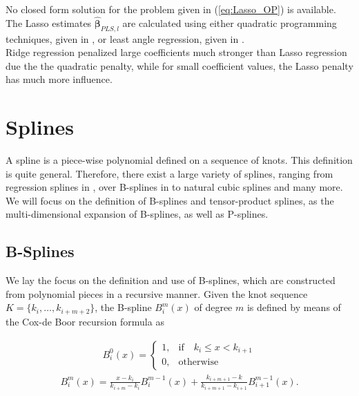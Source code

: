 \documentclass[10pt,a4paper]{article}
\begin{document}
No closed form solution for the problem given in (\ref{eq:Lasso_OP}) is available. The Lasso estimates $\boldsymbol{\hat{\beta}}_{PLS,l}$ are calculated using either quadratic programming techniques, given in \cite{tibshirani1996lasso}, or least angle regression, given in \cite{efron2004leastangleregression}. \\

Ridge regression penalized large coefficients much stronger than Lasso regression due the the quadratic penalty, while for small coefficient values, the Lasso penalty has much more influence. \cite{tibshirani1996lasso}

\section{Splines} \label{sec:Splines}
	
A spline is a piece-wise polynomial defined on a sequence of knots. This definition is quite general. Therefore, there exist a large variety of splines, ranging from regression splines in \cite{eubank1990regressionsplines}, over B-splines in \cite{deBoor1978practicalGuideToSplines} to natural cubic splines and many more. We will focus on the definition of B-splines and tensor-product splines, as the multi-dimensional expansion of B-splines, as well as P-splines. \cite{deBoor1978practicalGuideToSplines} \cite{eilers1996flexible}
\subsection{B-Splines}

We lay the focus on the definition and use of B-splines, which are constructed from polynomial pieces in a recursive manner. Given the knot sequence $K = \{k_i, \dots, k_{i+m+2}\}$,  the B-spline $B_i^m(x)$ of degree $m$ is defined by means of the Cox-de Boor recursion formula as

\begin{align} \label{eq:Bspline_recDef1}
	B_i^0(x) = \begin{cases} 1, & \text{if} \quad k_i \le x < k_{i+1} \\ 
					 		 0, & \text{otherwise} 
	\end{cases}
\end{align}
\begin{align} \label{eq:Bspline_recDef2}
	B_i^m(x) = \frac{x - k_i}{k_{i+m} - k_i} B_i^{m-1}(x) + \frac{k_{i+m+1} - k}{k_{i+m+1} - k_{i+1}} B_{i+1}^{m-1}(x).
\end{align}
\end{document}
